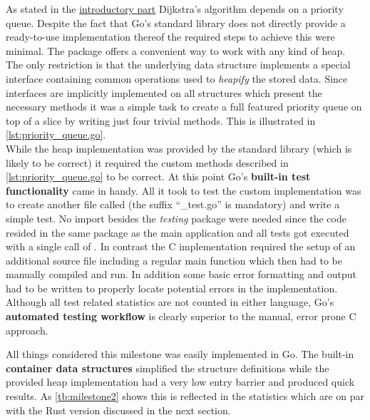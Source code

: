 As stated in the \hyperref[sec:Implementation::Graph_Representation]{introductory part} Dijkstra's algorithm depends on a priority queue. Despite the fact that Go's standard library does not directly provide a ready-to-use implementation thereof the required steps to achieve this were minimal. The package  offers a convenient way to work with any kind of heap. The only restriction is that the underlying data structure implements a special interface containing common operations used to \textit{heapify} the stored data. Since interfaces are implicitly implemented on all structures which present the necessary methods it was a simple task to create a full featured priority queue on top of a slice by writing just four trivial methods. This is illustrated in \autoref{lst:priority_queue.go}.
\\


While the heap implementation was provided by the standard library (which is likely to be correct) it required the custom methods described in \autoref{lst:priority_queue.go} to be correct. At this point Go's \textbf{built-in test functionality} came in handy. All it took to test the custom implementation was to create another file called  (the suffix ``\_test.go'' is mandatory) and write a simple test. No import besides the \textit{testing} package were needed since the code resided in the same package as the main application and all tests got executed with a single call of . In contrast the C implementation required the setup of an additional source file including a regular main function which then had to be manually compiled and run. In addition some basic error formatting and output had to be written to properly locate potential errors in the implementation. Although all test related statistics are not counted in either language, Go's \textbf{automated testing workflow} is clearly superior to the manual, error prone C approach.

All things considered this milestone was easily implemented in Go. The built-in \textbf{container data structures} simplified the structure definitions while the provided heap implementation had a very low entry barrier and produced quick results. As \autoref{tb:milestone2} shows this is reflected in the statistics which are on par with the Rust version discussed in the next section.

